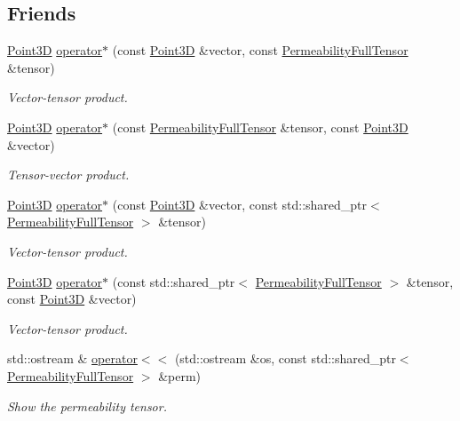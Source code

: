 \subsection*{Friends}
\begin{DoxyCompactItemize}
\item 
\hyperlink{classFVCode3D_1_1Point3D}{Point3D} \hyperlink{classFVCode3D_1_1PermeabilityFullTensor_ad8695e52ed0c1fee987bf9bd182d978e}{operator$\ast$} (const \hyperlink{classFVCode3D_1_1Point3D}{Point3D} \&vector, const \hyperlink{classFVCode3D_1_1PermeabilityFullTensor}{Permeability\+Full\+Tensor} \&tensor)
\begin{DoxyCompactList}\small\item\em Vector-\/tensor product. \end{DoxyCompactList}\item 
\hyperlink{classFVCode3D_1_1Point3D}{Point3D} \hyperlink{classFVCode3D_1_1PermeabilityFullTensor_a986c29319c47a991db50045774d6ac90}{operator$\ast$} (const \hyperlink{classFVCode3D_1_1PermeabilityFullTensor}{Permeability\+Full\+Tensor} \&tensor, const \hyperlink{classFVCode3D_1_1Point3D}{Point3D} \&vector)
\begin{DoxyCompactList}\small\item\em Tensor-\/vector product. \end{DoxyCompactList}\item 
\hyperlink{classFVCode3D_1_1Point3D}{Point3D} \hyperlink{classFVCode3D_1_1PermeabilityFullTensor_a9f303f34cf00a14889a168c3c1b45be7}{operator$\ast$} (const \hyperlink{classFVCode3D_1_1Point3D}{Point3D} \&vector, const std\+::shared\+\_\+ptr$<$ \hyperlink{classFVCode3D_1_1PermeabilityFullTensor}{Permeability\+Full\+Tensor} $>$ \&tensor)
\begin{DoxyCompactList}\small\item\em Vector-\/tensor product. \end{DoxyCompactList}\item 
\hyperlink{classFVCode3D_1_1Point3D}{Point3D} \hyperlink{classFVCode3D_1_1PermeabilityFullTensor_a4f010a92ab49d09b2d4bf4ce7d6afcf1}{operator$\ast$} (const std\+::shared\+\_\+ptr$<$ \hyperlink{classFVCode3D_1_1PermeabilityFullTensor}{Permeability\+Full\+Tensor} $>$ \&tensor, const \hyperlink{classFVCode3D_1_1Point3D}{Point3D} \&vector)
\begin{DoxyCompactList}\small\item\em Vector-\/tensor product. \end{DoxyCompactList}\item 
std\+::ostream \& \hyperlink{classFVCode3D_1_1PermeabilityFullTensor_a44a973e24bca59e4318433f87991a1b7}{operator$<$$<$} (std\+::ostream \&os, const std\+::shared\+\_\+ptr$<$ \hyperlink{classFVCode3D_1_1PermeabilityFullTensor}{Permeability\+Full\+Tensor} $>$ \&perm)
\begin{DoxyCompactList}\small\item\em Show the permeability tensor. \end{DoxyCompactList}\end{DoxyCompactItemize}
